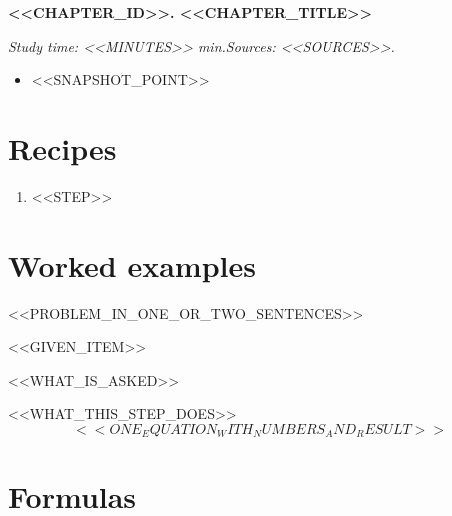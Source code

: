 \documentclass[11pt]{article}
\begin{document}
{\Large\bfseries <<CHAPTER_ID>>. <<CHAPTER_TITLE>>}\par
\textit{Study time: <<MINUTES>> min.\quad Sources: <<SOURCES>>.}\par\medskip

\begin{tmsnapshot}
\begin{itemize}
  \item <<SNAPSHOT_POINT>>
\end{itemize}
\end{tmsnapshot}

\section*{Recipes}
\begin{tmrecipe}
\begin{enumerate}
  \item <<STEP>>
\end{enumerate}
\end{tmrecipe}

\section*{Worked examples}
\begin{tmexample}
<<PROBLEM_IN_ONE_OR_TWO_SENTENCES>>
\begin{tmgiven}
  \item <<GIVEN_ITEM>>
\end{tmgiven}
\begin{tmfind}
  \item <<WHAT_IS_ASKED>>
\end{tmfind}
\begin{tmsolution}
  \item <<WHAT_THIS_STEP_DOES>>
  \[ <<ONE_EQUATION_WITH_NUMBERS_AND_RESULT>> \]
\end{tmsolution}
\end{tmexample}

\section*{Formulas}
\begin{tmsheet}
\end{tmsheet}
\end{document}

